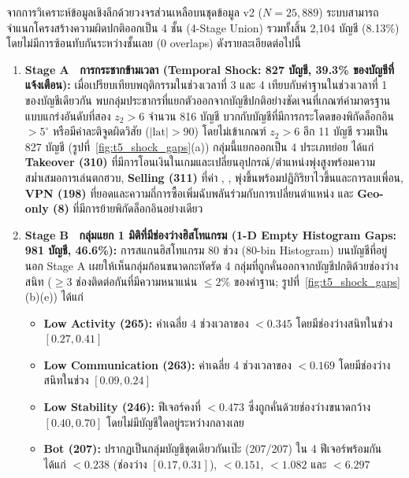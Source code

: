 จากการวิเคราะห์ข้อมูลเชิงลึกด้วยวงจรส่วนเหลือบนชุดข้อมูล v2 ($N = 25{,}889$) ระบบสามารถจำแนกโครงสร้างความผิดปกติออกเป็น 4 ชั้น (4-Stage Union) รวมทั้งสิ้น 2,104 บัญชี (8.13\%) โดยไม่มีการซ้อนทับกันระหว่างชั้นเลย (0 overlaps) ดังรายละเอียดต่อไปนี้

\begin{enumerate}
  \item \textbf{Stage A \textemdash\ การกระชากข้ามเวลา (Temporal Shock: 827 บัญชี, 39.3\% ของบัญชีที่แจ้งเตือน):} เมื่อเปรียบเทียบพฤติกรรมในช่วงเวลาที่ 3 และ 4 เทียบกับค่าฐานในช่วงเวลาที่ 1 ของบัญชีเดียวกัน พบกลุ่มประชากรที่แยกตัวออกจากบัญชีปกติอย่างชัดเจนที่เกณฑ์ค่ามาตรฐานแบบแกร่งอันดับที่สอง $z_2 > 6$ จำนวน 816 บัญชี บวกกับบัญชีที่มีการกระโดดของพิกัดล็อกอิน $> 5^\circ$ หรือมีค่าละติจูดผิดวิสัย ($|\text{lat}| > 90$) โดยไม่เข้าเกณฑ์ $z_2 > 6$ อีก 11 บัญชี รวมเป็น 827 บัญชี (รูปที่~\ref{fig:t5_shock_gaps}(a)) กลุ่มนี้แยกออกเป็น 4 ประเภทย่อย ได้แก่ \textbf{Takeover (310)} ที่มีการโอนเงินในเกมและเปลี่ยนอุปกรณ์/ตำแหน่งพุ่งสูงพร้อมความสม่ำเสมอการเล่นตกฮวบ, \textbf{Selling (311)} ที่ค่า , ,  พุ่งขึ้นพร้อมปฏิกิริยาไวขึ้นและการลบเพื่อน, \textbf{VPN (198)} ที่ยอดและความถี่การซื้อเพิ่มฉับพลันร่วมกับการเปลี่ยนตำแหน่ง และ \textbf{Geo-only (8)} ที่มีการย้ายพิกัดล็อกอินอย่างเดียว
  \item \textbf{Stage B \textemdash\ กลุ่มแยก 1 มิติที่มีช่องว่างฮิสโทแกรม (1-D Empty Histogram Gaps: 981 บัญชี, 46.6\%):} การสแกนฮิสโทแกรม 80 ช่วง (80-bin Histogram) บนบัญชีที่อยู่นอก Stage A เผยให้เห็นกลุ่มก้อนขนาดกะทัดรัด 4 กลุ่มที่ถูกคั่นออกจากบัญชีปกติด้วยช่องว่างสนิท ($\ge 3$ ช่องติดต่อกันที่มีความหนาแน่น $\le 2\%$ ของค่าฐาน; รูปที่~\ref{fig:t5_shock_gaps}(b)\textendash (e)) ได้แก่
    \begin{itemize}
      \item \textbf{Low Activity (265):} ค่าเฉลี่ย 4 ช่วงเวลาของ  $< 0.345$ โดยมีช่องว่างสนิทในช่วง $[0.27, 0.41]$
      \item \textbf{Low Communication (263):} ค่าเฉลี่ย 4 ช่วงเวลาของ  $< 0.169$ โดยมีช่องว่างสนิทในช่วง $[0.09, 0.24]$
      \item \textbf{Low Stability (246):} ฟีเจอร์คงที่  $< 0.473$ ซึ่งถูกคั่นด้วยช่องว่างขนาดกว้าง $[0.40, 0.70]$ โดยไม่มีบัญชีใดอยู่ระหว่างกลางเลย
      \item \textbf{Bot (207):} ปรากฏเป็นกลุ่มบัญชีชุดเดียวกันเป๊ะ (207/207) ใน 4 ฟีเจอร์พร้อมกัน ได้แก่  $< 0.238$ (ช่องว่าง $[0.17, 0.31]$),  $< 0.151$,  $< 1.082$ และ  $< 6.297$

\end{itemize}
\end{enumerate}
